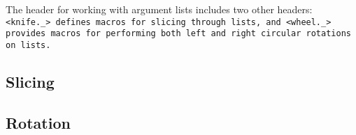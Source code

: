 \def\Subsection#1{\subsection{#1}}

The header  for working with argument lists includes two other headers:
\tt{<knife._>} defines macros for slicing through lists, and \tt{<wheel._>}
provides macros for performing both left and right circular rotations on lists.

\Subsection{Slicing}

\Subsection{Rotation}
